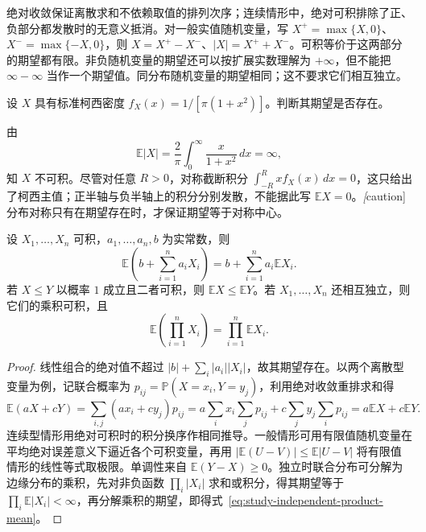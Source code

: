 绝对收敛保证离散求和不依赖取值的排列次序；连续情形中，绝对可积排除了正、负部分都发散时的无意义抵消。对一般实值随机变量，写 $X^+=\max\{X,0\}$、$X^-=\max\{-X,0\}$，则 $X=X^+-X^-$、$|X|=X^++X^-$。可积等价于这两部分的期望都有限。非负随机变量的期望还可以按扩展实数理解为 $+\infty$，但不能把 $\infty-\infty$ 当作一个期望值。同分布随机变量的期望相同；这不要求它们相互独立。

\begin{example}
\label{ex:study-cauchy-no-mean}
设 $X$ 具有标准柯西密度 $f_X(x)=1/[\pi(1+x^2)]$。判断其期望是否存在。
\end{example}

\begin{solve}
由
\[
  \mathbb E|X|=\frac2\pi\int_0^\infty\frac{x}{1+x^2}\,dx=\infty,
\]
知 $X$ 不可积。尽管对任意 $R>0$，对称截断积分 $\int_{-R}^Rxf_X(x)\,dx=0$，这只给出了柯西主值；正半轴与负半轴上的积分分别发散，不能据此写 $\mathbb E X=0$。\emph[caution]{分布对称只有在期望存在时，才保证期望等于对称中心。}
\end{solve}

\begin{theorem}
\label{thm:study-expectation-properties}
设 $X_1,\ldots,X_n$ 可积，$a_1,\ldots,a_n,b$ 为实常数，则
\begin{equation}
  \mathbb E\left(b+\sum_{i=1}^na_iX_i\right)
    =b+\sum_{i=1}^na_i\mathbb E X_i.
  \label{eq:study-expectation-linearity}
\end{equation}
若 $X\le Y$ 以概率 $1$ 成立且二者可积，则 $\mathbb E X\le\mathbb E Y$。若 $X_1,\ldots,X_n$ 还相互独立，则它们的乘积可积，且
\begin{equation}
  \mathbb E\left(\prod_{i=1}^nX_i\right)
    =\prod_{i=1}^n\mathbb E X_i.
  \label{eq:study-independent-product-mean}
\end{equation}
\end{theorem}

\begin{proof}
线性组合的绝对值不超过 $|b|+\sum_i|a_i||X_i|$，故其期望存在。以两个离散型变量为例，记联合概率为 $p_{ij}=\mathbb P(X=x_i,Y=y_j)$，利用绝对收敛重排求和得
\[
  \mathbb E(aX+cY)=\sum_{i,j}(ax_i+cy_j)p_{ij}
    =a\sum_i x_i\sum_jp_{ij}+c\sum_jy_j\sum_ip_{ij}
    =a\mathbb E X+c\mathbb E Y.
\]
连续型情形用绝对可积时的积分换序作相同推导。一般情形可用有限值随机变量在平均绝对误差意义下逼近各个可积变量，再用 $|\mathbb E(U-V)|\le\mathbb E|U-V|$ 将有限值情形的线性等式取极限。单调性来自 $\mathbb E(Y-X)\ge0$。独立时联合分布可分解为边缘分布的乘积，先对非负函数 $\prod_i|X_i|$ 求和或积分，得其期望等于 $\prod_i\mathbb E|X_i|<\infty$，再分解乘积的期望，即得式~\eqref{eq:study-independent-product-mean}。
\end{proof}


